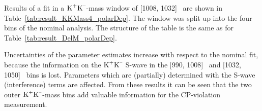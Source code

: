Results of a fit in a $\text{K}^\text{+}\text{K}^\text{--}$-mass window of [1008, 1032]~\MeV{} are shown in Table~\ref{tab:result_KKMass4_polarDep}. The window was split
up into the four bins of the nominal analysis. The structure of the table is the same as for Table~\ref{tab:result_DelM_polarDep}.

Uncertainties of the parameter estimates increase with respect to the nominal fit, because the information on the $\text{K}^\text{+}\text{K}^\text{--}$ S-wave in the [990,
1008]~\MeV{} and [1032, 1050]~\MeV{} bins is lost. Parameters which are (partially) determined with the S-wave (interference) terms are
affected. From these results it can be seen that the two outer $\text{K}^\text{+}\text{K}^\text{--}$-mass bins add valuable information for the CP-violation measurement.

